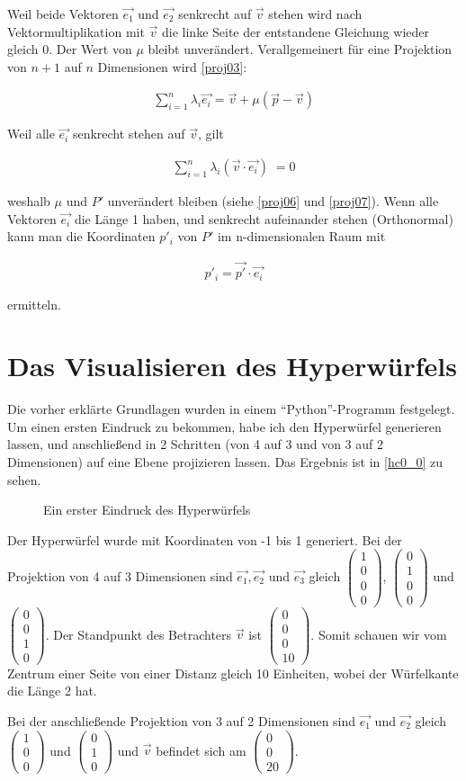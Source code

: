 \documentclass[10pt,a4paper,twoside,titlepage]{article}
\newcommand{\myeq}[2]{
	\begin{equation}
		\begin{split}
			#1
		\end{split}
		\label{#2}
	\end{equation}
}
\newcommand{\colvec}[1]{$\begin{pmatrix}#1\end{pmatrix}$}
\newcommand{\psimg}[3]{
    \begin{figure}[!ht]
        \centering
        
        \caption{#2}
        #3
    \end{figure}
}
\begin{document}
Weil beide Vektoren $\vec{e_1}$ und $\vec{e_2}$ senkrecht auf $\vec{v}$ stehen
wird nach Vektormultiplikation mit $\vec{v}$ die linke Seite der entstandene 
Gleichung wieder gleich 0. Der Wert von $\mu$ bleibt unverändert. Verallgemeinert
für eine Projektion von $n+1$ auf $n$ Dimensionen wird \autoref{proj03}:
\myeq{
	\sum_{i=1}^{n}\lambda_i\vec{e_i} = \vec{v} + \mu(\vec{p}-\vec{v})
}{proj09}
Weil alle $\vec{e_i}$ senkrecht stehen auf $\vec{v}$, gilt
\myeq{
	\sum_{i=1}^{n}\lambda_i (\vec{v}\cdot\vec{e_i})\;=0
}{proj10}
weshalb $\mu$ und $P'$ unverändert bleiben (siehe \autoref{proj06} und 
\autoref{proj07}). Wenn alle
Vektoren $\vec{e_i}$ die Länge 1 haben, und senkrecht aufeinander stehen
(Orthonormal) kann man die Koordinaten $p'_i$ von $P'$ im n-dimensionalen 
Raum mit
\myeq{
	p'_i = \vec{p'}\cdot\vec{e_i}
}{proj11}
ermitteln.

\section{Das Visualisieren des Hyperwürfels}
Die vorher erklärte Grundlagen wurden in einem "`Python"'-Programm 
festgelegt. Um einen ersten Eindruck zu bekommen, habe ich den Hyperwürfel
generieren lassen, und anschließend in 2 Schritten (von 4 auf 3 
und von 3 auf 2 Dimensionen) auf eine Ebene projizieren lassen. Das Ergebnis
ist in \autoref{hc0_0} zu sehen.

\psimg{python/hc0_0.tex}{Ein erster Eindruck des Hyperwürfels}{\label{hc0_0}}

Der Hyperwürfel wurde mit Koordinaten von -1 bis 1 generiert. 
Bei der Projektion von 4 auf 3 Dimensionen sind $\vec{e_1}, \vec{e_2}$ und 
$\vec{e_3}$ gleich \colvec{1\\0\\0\\0}, \colvec{0\\1\\0\\0} und \colvec{0\\0\\1\\0}. 
Der Standpunkt des Betrachters $\vec{v}$ ist \colvec{0\\0\\0\\10}. Somit 
schauen wir vom Zentrum einer Seite
von einer Distanz gleich 10 Einheiten, wobei der Würfelkante die Länge 2 hat.

Bei der anschließende Projektion von 3 auf 2 Dimensionen sind $\vec{e_1}$ und 
$\vec{e_2}$ gleich \colvec{1\\0\\0} und \colvec{0\\1\\0} und $ \vec{v} $ befindet 
sich am \colvec{0\\0\\20}.
\end{document}
